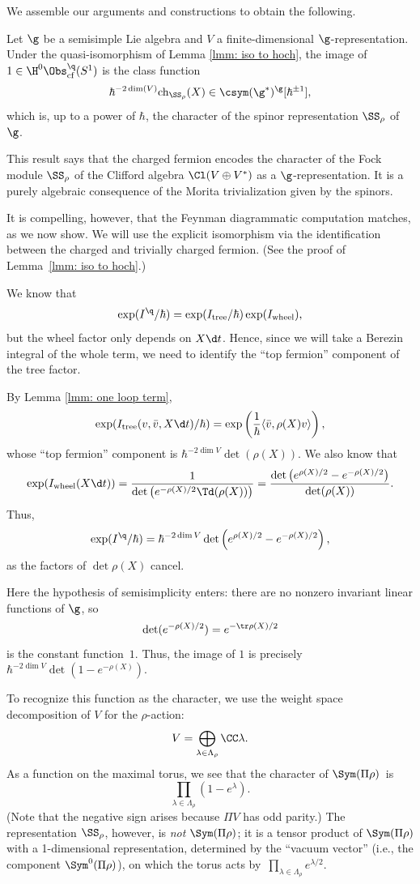 \documentclass[10pt]{amsart}
\begin{document}
We assemble our arguments and constructions to obtain the following.

\begin{prp}
\label{prp: character}
Let $\g$ be a semisimple Lie algebra and $V$ a finite-dimensional $\g$-representation.
Under the quasi-isomorphism of Lemma \ref{lmm: iso to hoch},
the image of $1 \in \H^0\Obs^\q_{\rm cf}(S^1)$ is the class function
\[
\hbar^{-2\dim(V)}{\rm ch}_{\SS_\rho}(X) \in \csym(\g^*)^\g[\hbar^{\pm 1}],
\] 
which is, up to a power of $\hbar$, the character of the spinor representation $\SS_\rho$ of~$\g$.
\end{prp}

This result says that the charged fermion encodes the character of the Fock module $\SS_\rho$ of the Clifford algebra $\Cl(V \oplus V^*)$ as a $\g$-representation.
It is a purely algebraic consequence of the Morita trivialization given by the spinors.

It is compelling, however, that the Feynman diagrammatic computation matches, 
as we now show.
We will use the explicit isomorphism via the identification between the charged and trivially charged fermion. 
(See the proof of Lemma~\ref{lmm: iso to hoch}.)

We know that
\[
\exp(I^\q/\hbar) = \exp(I_{\rm tree}/\hbar) \exp(I_{\rm wheel}),
\]
but the wheel factor only depends on $X \d t$.
Hence, since we will take a Berezin integral of the whole term,
we need to identify the ``top fermion'' component of the tree factor.

By Lemma \ref{lmm: one loop term}, 
\[
\exp(I_{\rm tree}(v,\bar{v},X \d t)/\hbar) = \exp\left(\frac{1}{\hbar} \langle \bar{v}, \rho(X) v\rangle\right),
\]
whose ``top fermion'' component is $\hbar^{-2\dim V}\det(\rho(X))$.
We also know that
\[
\exp(I_{\rm wheel}(X \d t)) 
= \frac{1}{\det\left(e^{-\rho(X)/2}\Td(\rho(X))\right)}
= \frac{\det \left(e^{\rho(X)/2} - e^{-\rho(X)/2} \right)}{\det(\rho(X))}.
\]
Thus, 
\[
\exp(I^\q/\hbar)  = \hbar^{-2\dim V} \det \left(e^{\rho(X)/2} - e^{-\rho(X)/2} \right),
\]
as the factors of $\det \rho(X)$ cancel.

Here the hypothesis of semisimplicity enters:
there are no nonzero invariant linear functions of $\g$,
so 
\[
\det (e^{-\rho(X)/2}) = e^{-\tr \rho(X)/2}
\]
is the constant function~$1$.
Thus, the image of $1$ is precisely $\hbar^{-2\dim V}\det(1 - e^{-\rho(X)})$.

To recognize this function as the character,
we use the weight space decomposition of $V$ for the $\rho$-action: 
\[
V = \bigoplus_{\lambda \in \Lambda_\rho} \CC \lambda.
\] 
As a function on the maximal torus,
we see that the character of $\Sym(\Pi\rho)$~is
\[
\prod_{\lambda \in \Lambda_\rho} (1-e^{\lambda}).
\]
(Note that the negative sign arises because $\Pi V$ has odd parity.)
The representation $\SS_\rho$, however, is {\em not} $\Sym(\Pi\rho)$;
it is a tensor product of $\Sym(\Pi\rho)$ with a 1-dimensional representation,
determined by the ``vacuum vector'' (i.e., the component $\Sym^0(\Pi\rho)$),
on which the torus acts by~$\prod_{\lambda \in \Lambda_\rho} e^{\lambda/2}$.
\end{document}
